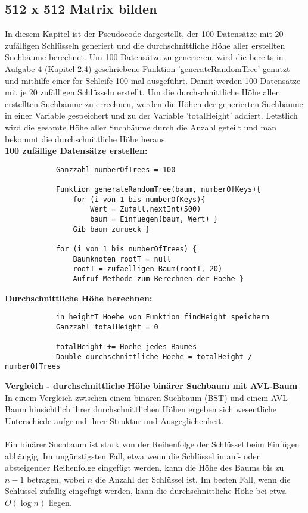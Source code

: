 \documentclass[12pt]{article}
\begin{document}
		\subsection{512 x 512 Matrix bilden}
		In diesem Kapitel ist der Pseudocode dargestellt, der 100 Datensätze mit 20 zufälligen Schlüsseln generiert und die durchschnittliche Höhe aller erstellten Suchbäume berechnet. Um 100 Datensätze zu generieren, wird die bereits in Aufgabe 4 (Kapitel 2.4) geschriebene Funktion 'generateRandomTree' genutzt und mithilfe einer for-Schleife 100 mal ausgeführt. Damit werden 100 Datensätze mit je 20 zufälligen Schlüsseln erstellt. Um die durchschnittliche Höhe aller erstellten Suchbäume zu errechnen, werden die Höhen der generierten Suchbäume in einer Variable gespeichert und zu der Variable 'totalHeight' addiert. Letztlich wird die gesamte Höhe aller Suchbäume durch die Anzahl geteilt und man bekommt die durchschnittliche Höhe heraus.\\
		\newline
		\textbf{100 zufällige Datensätze erstellen:}
		\begin{lstlisting}
			Ganzzahl numberOfTrees = 100
			
			Funktion generateRandomTree(baum, numberOfKeys){
				for (i von 1 bis numberOfKeys){
					Wert = Zufall.nextInt(500)
					baum = Einfuegen(baum, Wert) }
				Gib baum zurueck }
			
			for (i von 1 bis numberOfTrees) {
				Baumknoten rootT = null
				rootT = zufaelligen Baum(rootT, 20)
				Aufruf Methode zum Berechnen der Hoehe }
		\end{lstlisting}
		\vspace{0.5cm}
		\textbf{Durchschnittliche Höhe berechnen:}
		\begin{lstlisting}
			in heightT Hoehe von Funktion findHeight speichern
			Ganzzahl totalHeight = 0
			
			totalHeight += Hoehe jedes Baumes
			Double durchschnittliche Hoehe = totalHeight / numberOfTrees
		\end{lstlisting} 
		\vspace{0.5cm}
		\textbf{Vergleich - durchschnittliche Höhe binärer Suchbaum mit AVL-Baum} \newline
		In einem Vergleich zwischen einem binären Suchbaum (BST) und einem AVL-Baum hinsichtlich ihrer durchschnittlichen Höhen ergeben sich wesentliche Unterschiede aufgrund ihrer Struktur und Ausgeglichenheit. \\ \\
		Ein binärer Suchbaum ist stark von der Reihenfolge der Schlüssel beim Einfügen abhängig. Im ungünstigsten Fall, etwa wenn die Schlüssel in auf- oder absteigender Reihenfolge eingefügt werden, kann die Höhe des Baums bis zu \(n-1\) betragen, wobei \(n\) die Anzahl der Schlüssel ist. Im besten Fall, wenn die Schlüssel zufällig eingefügt werden, kann die durchschnittliche Höhe bei etwa \(O(\log n)\) liegen. \newline
\end{document}
